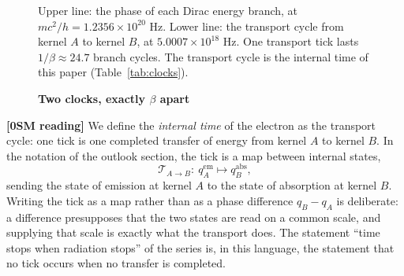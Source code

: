 \documentclass[%
 reprint, amsmath,amssymb, aps, prb, ]{revtex4-2}
\numberwithin{equation}{section}
\newcommand{\Tmap}{\mathcal{T}}
\begin{document}
\begin{figure}[t!]
\centering
{}
\caption{\textbf{Two clocks, exactly $\beta$ apart}}
\label{fig:clocks}
\vspace{0.4em}
\begin{minipage}{0.95\textwidth}
\justifying\small
Upper line: the phase of each Dirac energy branch, at $mc^2/h=1.2356\times10^{20}$ Hz. Lower line: the transport cycle from kernel $A$ to kernel $B$, at $5.0007\times10^{18}$ Hz. One transport tick lasts $1/\beta\approx24.7$ branch cycles. The transport cycle is the internal time of this paper (Table~\ref{tab:clocks}).
\end{minipage}
\end{figure}

\textbf{[0SM reading]} We define the \emph{internal time} of the electron as the transport cycle: one tick is one completed transfer of energy from kernel $A$ to kernel $B$. In the notation of the outlook section, the tick is a map between internal states,
\begin{equation}
\Tmap_{A\to B}:\ q_A^{\mathrm{em}}\longmapsto q_B^{\mathrm{abs}},
\label{eq:tick}
\end{equation}
sending the state of emission at kernel $A$ to the state of absorption at kernel $B$. Writing the tick as a map rather than as a phase difference $q_B-q_A$ is deliberate: a difference presupposes that the two states are read on a common scale, and supplying that scale is exactly what the transport does. The statement ``time stops when radiation stops'' of the series is, in this language, the statement that no tick occurs when no transfer is completed.
\end{document}
